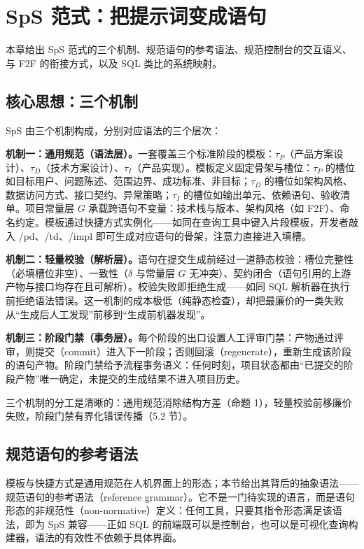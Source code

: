 \documentclass[11pt,a4paper]{ctexart}
\begin{document}
\section{SpS 范式：把提示词变成语句}
本章给出 SpS 范式的三个机制、规范语句的参考语法、规范控制台的交互语义、与 F2F 的衔接方式，以及 SQL 类比的系统映射。

\subsection{核心思想：三个机制}
SpS 由三个机制构成，分别对应语法的三个层次：

\textbf{机制一：通用规范（语法层）。}一套覆盖三个标准阶段的模板：$\tau_P$（产品方案设计）、$\tau_D$（技术方案设计）、$\tau_I$（产品实现）。模板定义固定骨架与槽位：$\tau_P$ 的槽位如目标用户、问题陈述、范围边界、成功标准、非目标；$\tau_D$ 的槽位如架构风格、数据访问方式、接口契约、异常策略；$\tau_I$ 的槽位如输出单元、依赖语句、验收清单。项目常量层 $G$ 承载跨语句不变量：技术栈与版本、架构风格（如 F2F）、命名约定。模板通过快捷方式实例化——如同在查询工具中键入片段模板，开发者敲入 /pd、/td、/impl 即可生成对应语句的骨架，注意力直接进入填槽。

\textbf{机制二：轻量校验（解析层）。}语句在提交生成前经过一道静态校验：槽位完整性（必填槽位非空）、一致性（$\delta$ 与常量层 $G$ 无冲突）、契约闭合（语句引用的上游产物与接口均存在且可解析）。校验失败即拒绝生成——如同 SQL 解析器在执行前拒绝语法错误。这一机制的成本极低（纯静态检查），却把最廉价的一类失败从“生成后人工发现”前移到“生成前机器发现”。

\textbf{机制三：阶段门禁（事务层）。}每个阶段的出口设置人工评审门禁：产物通过评审，则提交（commit）进入下一阶段；否则回滚（regenerate），重新生成该阶段的语句产物。阶段门禁给予流程事务语义：任何时刻，项目状态都由“已提交的阶段产物”唯一确定，未提交的生成结果不进入项目历史。

三个机制的分工是清晰的：通用规范消除结构方差（命题 1），轻量校验前移廉价失败，阶段门禁有界化错误传播（5.2 节）。

\subsection{规范语句的参考语法}
模板与快捷方式是通用规范在人机界面上的形态；本节给出其背后的抽象语法——规范语句的参考语法（reference grammar）。它不是一门待实现的语言，而是语句形态的非规范性（non-normative）定义：任何工具，只要其指令形态满足该语法，即为 SpS 兼容——正如 SQL 的前端既可以是控制台，也可以是可视化查询构建器，语法的有效性不依赖于具体界面。
\end{document}
